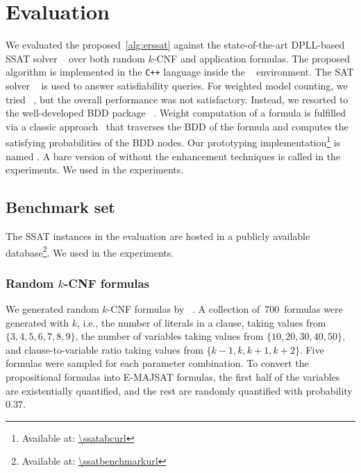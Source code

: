 \renewcommand{\nrandom}{\num{700}}
\renewcommand{\napplication}{\num{212}}
\newcommand{\ntoilet}{\num{77}}
\newcommand{\nmaxcount}{\num{26}}
\newcommand{\nsandcastle}{\num{25}}
\newcommand{\nconformant}{\num{24}}
\newcommand{\nmpec}{\num{60}}

\section{Evaluation}
\label{sect:erssat-evaluation}

We evaluated the proposed~\cref{alg:erssat} against
the state-of-the-art DPLL-based SSAT solver \dcssat~\cite{Majercik2005}
over both random $k$-CNF and application formulas.
The proposed algorithm is implemented in the \texttt{C++} language inside the \abc~\cite{ABC} environment.
The SAT solver ~\cite{Een2003Solver} is used to answer satisfiability queries.
For weighted model counting,
we tried \cachet~\cite{Sang2004,Sang2005ModelCounting},
but the overall performance was not satisfactory.
Instead, we resorted to the well-developed BDD package \cudd~\cite{CUDD}.
Weight computation of a formula is fulfilled via a classic approach~\cite{Darwiche2002KnowledgeCompilation} that traverses the BDD of the formula and computes the satisfying probabilities of the BDD nodes.
Our prototyping implementation\footnote{Available at: \url{\ssatabcurl}} is named \erssat.
A bare version of \erssat without the enhancement techniques is called \erssatb in the experiments.
We used \ssatABCRevision in the experiments.

\subsection{Benchmark set}
The SSAT instances in the evaluation are hosted
in a publicly available database\footnote{Available at: \url{\ssatbenchmarkurl}}.
We used \ssatBenchRevision in the experiments.

\subsubsection{Random $k$-CNF formulas}
We generated random $k$-CNF formulas by \cnfgen~\cite{Lauria2017CNFgen}.
A collection of~\nrandom~formulas were generated with $k$,
i.e., the number of literals in a clause,
taking values from $\{3,4,5,6,7,8,9\}$,
the number of variables taking values from $\{10,20,30,40,50\}$,
and clause-to-variable ratio taking values from $\{k-1,k,k+1,k+2\}$.
Five formulas were sampled for each parameter combination.
To convert the propositional formulas into E-MAJSAT formulas,
the first half of the variables are existentially quantified,
and the rest are randomly quantified with probability $0.37$.

